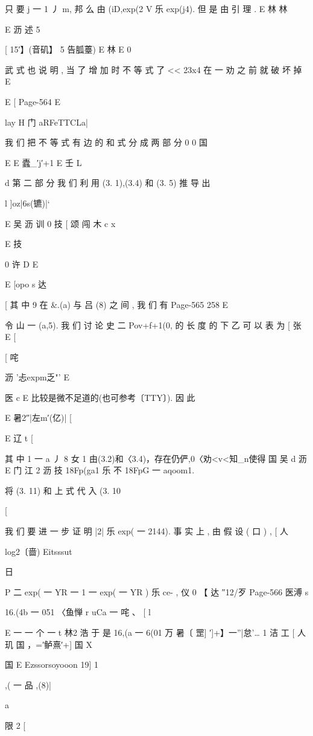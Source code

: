 {{只 要 j 一 1 丿 m, 邦 么 由 (iD,exp(2 V 乐 exp(j4). 但 是 由 引 理 .
E 林 林

E 沥 述 5

[ 15′】(音矶】 5 告胍薹) E 林 E 0

武 式 也 说 明 , 当 了 增 加 时 不 等 式 了 << 23x4 在 一 劝 之 前 就 破 坏 掉
E

E [
Page-564
E

lay H 门 aRFeTTCLa|

我 们 把 不 等 式 有 边 的 和 式 分 成 两 部 分
0 0
国

E E 蠹_′j′+1
E
壬 L

d
第 二 部 分 我 们 利 用 (3. 1),(3.4) 和 (3. 5) 推 导 出

l ]oz|6s(镳)|`

E 吴 沥 训
0 技 [ 颂 闯 木 c
x

E 技

0
许
D E

E
[opo s 达

[
其 中 9 在 &.(a) 与 吕 (8) 之 间 , 我 们 有
Page-565
258 E

令 山 一 (a,5). 我 们 讨 论 史 二 Pov+f+1(0, 的 长 度 的 下
乙 可 以 表 为
[ 张
E [

[ 咤

沥 '忐expm乏"' E

医 c
E 比较是微不足道的(也可参考〔TTY〕). 因 此

E 暑2″|左m′(亿)| [

E 辽 t [

其 中 1 一 a 丿 8 女 1
由(3.2)和〈3.4)，存在仍俨,0〈劝<v<知_n使得
国 吴
d 沥
E 门 江 2 沥 技
18Fp(ga1 乐 不 18FpG 一 aqoom1.

将 (3. 11) 和 上 式 代 入 (3. 10

[

我 们 要 进 一 步 证 明 |2| 乐 exp( 一 2144). 事 实 上 , 由 假 设 ( 口 ) ,
[ 人

log2〔啬) Eitsssut

日

P 二 exp( 一 YR 一 1 一 exp( 一 YR ) 乐 ce- ,
仪 0 【 达 ″12/歹
Page-566
医溥 s

16.(4b 一 051 〈鱼惮 r uCa 一 咤 、
[ l

E 一 一 个 一
t 林2 浩
于 是
16,(a 一 6(01 万 暑〔 罡] ′]+】一”|怠'… 1 洁 工
[
人 玑 国
，=′鲈熹′+] 国 X

国
E Ezssorsoyooon
19] 1

,( 一 品 ,(8)|

a

限 2
[

}}
